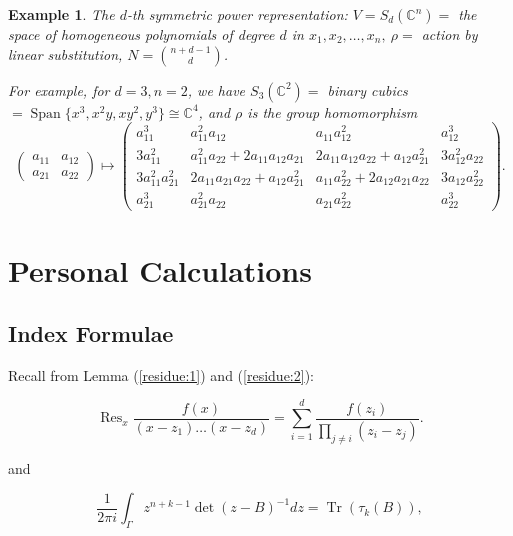 \documentclass{article}
\newtheorem{example}{Example}
\newcommand{\CC}{\mathbb{C}}
\newcommand{\pbrackets}[1]{\left( #1 \right)}
\DeclareMathOperator{\Tr}{Tr}
\DeclareMathOperator{\Span}{Span}
\DeclareMathOperator{\Res}{Res}
\begin{document}
	\begin{example}
		The $d$-th symmetric power representation: $V = S_{d}(\CC^{n}) =$ the space of homogeneous polynomials of degree $d$ in $x_{1}, x_{2}, \ldots, x_{n},\ \rho =$ action by linear substitution, $N = \binom{n + d -1}{d}$.
		
		For example, for $d = 3, n = 2$, we have $S_{3}(\CC^{2}) =$ binary cubics $=\Span\{x^{3}, x^{2}y, xy^{2}, y^{3}\} \cong \CC^{4}$, and $\rho$ is the group homomorphism
		\begin{equation*}
				\begin{pmatrix}
					a_{11} & a_{12} \\ 
					a_{21} & a_{22}
				\end{pmatrix}
				\mapsto
				\begin{pmatrix}
					a_{11}^{3} & a_{11}^{2}a_{12} & a_{11}a_{12}^{2} & a_{12}^{3} \\
					3a_{11}^{2} & a_{11}^{2}a_{22} + 2a_{11}a_{12}a_{21} & 2a_{11}a_{12}a_{22} + a_{12}a_{21}^{2} & 3a_{12}^{2}a_{22} \\ 
					3a_{11}^{2}a_{21}^{2} & 2a_{11}a_{21}a_{22} + a_{12}a_{21}^{2} & a_{11}a_{22}^{2} + 2a_{12}a_{21}a_{22} & 3a_{12}a_{22}^{2} \\ 
					a_{21}^{3} & a_{21}^{2}a_{22} & a_{21}a_{22}^{2} & a_{22}^{3}
				\end{pmatrix}.
		\end{equation*}
	\end{example}
	
	
	
	\section{Personal Calculations}
	
	\subsection{Index Formulae}
	
	Recall from Lemma (\ref{residue:1}) and (\ref{residue:2}):
	
	\begin{equation*}
		\Res_{x} \frac{f(x)}{(x - z_{1})\ldots(x - z_{d})} = \sum\limits_{i = 1}^{d}\frac{f(z_{i})}{\prod_{j \neq i}(z_{i} - z_{j})}.
	\end{equation*}
	
	and
	
	\begin{equation*}
		\frac{1}{2\pi i} \int_{\Gamma} z^{n + k -1} \det(z - B)^{-1} dz = \Tr\pbrackets{\tau_{k}(B)},
	\end{equation*}
\end{document}
